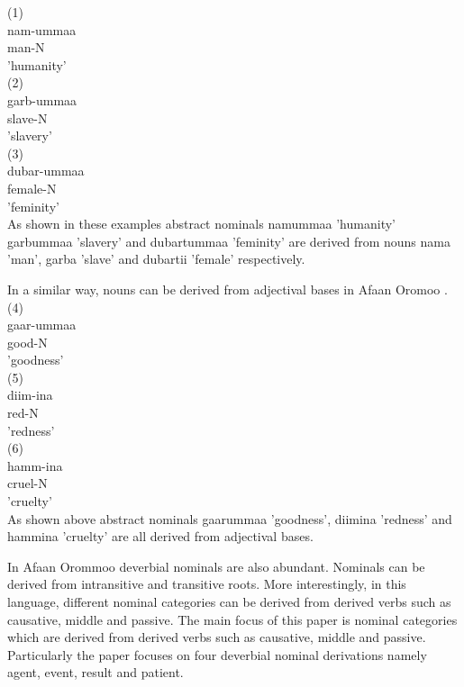 \documentclass[11pt,a4paper]{article}
\begin{document}
(1)\\
\indent nam-ummaa \\
\indent man-N\\
\indent 'humanity'\\

(2)\\
\indent garb-ummaa\\
\indent slave-N\\
\indent 'slavery'\\

(3)\\
\indent dubar-ummaa\\
\indent female-N\\
\indent 'feminity'\\

As shown in these examples abstract nominals namummaa 'humanity' garbummaa 'slavery' and dubartummaa 'feminity' are derived from nouns nama 'man', garba 'slave' and dubartii 'female' respectively. 

In a similar way, nouns can be derived from adjectival bases in Afaan Oromoo \cite{gaddisa2001,temesgen1985,tolemariam2011,tolemariam2009}. \\

(4) \\
\indent gaar-ummaa\\
\indent good-N\\
\indent 'goodness'\\

(5)\\
\indent diim-ina\\
\indent red-N\\
\indent 'redness'\\

(6)\\
\indent hamm-ina\\
\indent cruel-N\\
\indent 'cruelty'\\

As shown above abstract nominals gaarummaa 'goodness', diimina 'redness' and hammina 'cruelty' are all derived from adjectival bases. 

In Afaan Orommoo deverbial nominals are also abundant. Nominals can be derived from intransitive and transitive roots. More interestingly, in this language, different nominal categories can be derived from derived verbs such as causative, middle and passive. The main focus of this paper is nominal categories which are derived from derived verbs such as causative, middle and passive. Particularly the paper focuses on four deverbial nominal derivations namely agent, event, result and patient. 
\end{document}

